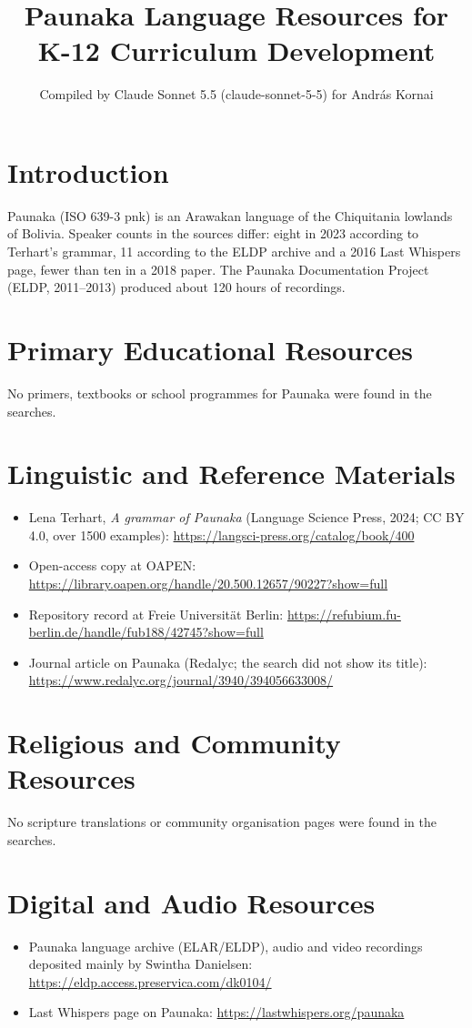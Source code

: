 \documentclass[12pt]{article}
\title{Paunaka Language Resources for K-12 Curriculum Development}
\author{Compiled by Claude Sonnet 5.5 (claude-sonnet-5-5) for Andr\'as Kornai}
\date{}
\begin{document}
\maketitle

\section{Introduction}
Paunaka (ISO 639-3 pnk) is an Arawakan language of the Chiquitania lowlands of Bolivia. Speaker counts in the sources differ: eight in 2023 according to Terhart's grammar, 11 according to the ELDP archive and a 2016 Last Whispers page, fewer than ten in a 2018 paper. The Paunaka Documentation Project (ELDP, 2011--2013) produced about 120 hours of recordings.

\section{Primary Educational Resources}
No primers, textbooks or school programmes for Paunaka were found in the searches.

\section{Linguistic and Reference Materials}
\begin{itemize}
\item Lena Terhart, \emph{A grammar of Paunaka} (Language Science Press, 2024; CC BY 4.0, over 1500 examples): \url{https://langsci-press.org/catalog/book/400}
\item Open-access copy at OAPEN: \url{https://library.oapen.org/handle/20.500.12657/90227?show=full}
\item Repository record at Freie Universit\"at Berlin: \url{https://refubium.fu-berlin.de/handle/fub188/42745?show=full}
\item Journal article on Paunaka (Redalyc; the search did not show its title): \url{https://www.redalyc.org/journal/3940/394056633008/}
\end{itemize}

\section{Religious and Community Resources}
No scripture translations or community organisation pages were found in the searches.

\section{Digital and Audio Resources}
\begin{itemize}
\item Paunaka language archive (ELAR/ELDP), audio and video recordings deposited mainly by Swintha Danielsen: \url{https://eldp.access.preservica.com/dk0104/}
\item Last Whispers page on Paunaka: \url{https://lastwhispers.org/paunaka}
\end{itemize}
\end{document}
